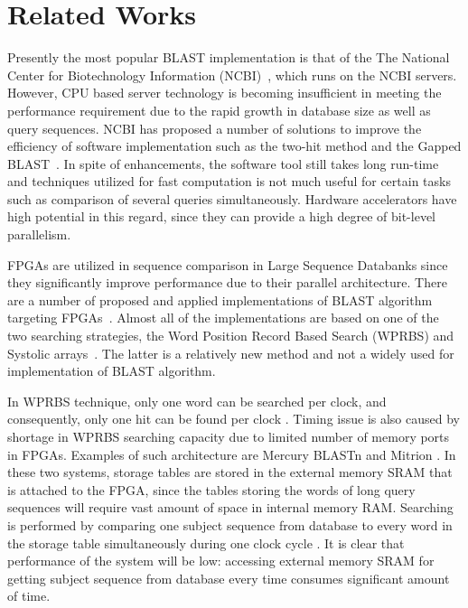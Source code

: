 \section{Related Works}
\label{sec:background}


Presently the most popular BLAST implementation is that of the The National Center for Biotechnology Information (NCBI)~\cite{ncbiBlast}, which runs on the NCBI servers.
However, CPU based server technology is becoming insufficient in meeting the performance requirement due to the rapid growth in database size as well as query sequences.
NCBI has proposed a number of solutions to improve the efficiency of software implementation such as the two-hit method and the Gapped BLAST~\cite{WIENBRANDT20111967}.
In spite of enhancements, the software tool still takes long run-time and techniques utilized for fast computation is not much useful for certain tasks such as comparison of several queries simultaneously. 
Hardware accelerators have high potential in this regard, since they can provide a high degree of bit-level parallelism.

FPGAs are utilized in sequence comparison in Large Sequence Databanks since they significantly improve performance due to their parallel architecture. 
There are a number of proposed and applied implementations of BLAST algorithm targeting FPGAs~\cite{oliver2005hyper}. 
Almost all of the implementations are based on one of the two searching strategies, the Word Position Record Based Search (WPRBS) and Systolic arrays~\cite{guo2012systolic}. 
The latter is a relatively new method and not a widely used for implementation of BLAST algorithm. 

In WPRBS technique, only one word can be searched per clock, and consequently, only one hit can be found per clock \cite{guo2012open}. 
Timing issue is also caused by shortage in WPRBS searching capacity due to limited number of memory ports in FPGAs. 
Examples of such architecture are Mercury BLASTn \cite{buhler2007mercury} and Mitrion \cite{guo2012systolic}. 
In these two systems, storage tables are stored in the external memory SRAM that is attached to the FPGA, since the tables storing the words of long query sequences will require vast amount of space in internal memory RAM. 
Searching is performed by comparing one subject sequence from database to every word in the storage table simultaneously during one clock cycle \cite{guo2012systolic}. 
It is clear that performance of the system will be low: accessing external memory SRAM for getting subject sequence from database every time consumes significant amount of time. 

